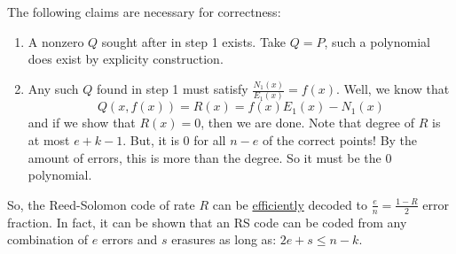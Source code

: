 The following claims are necessary for correctness:
\begin{enumerate}
    \item A nonzero $Q$ sought after in step 1 exists. Take $Q = P$, such a polynomial does exist by explicity construction.
    \item Any such $Q$ found in step 1 must satisfy $\frac{N_1(x)}{E_1(x)} = f(x)$. Well, we know that
    \[ Q(x, f(x)) = R(x) = f(x) E_1(x) - N_1(x) \]
    and if we show that $R(x) = 0$, then we are done. Note that degree of $R$ is at most $e + k - 1$. But, it is $0$ for all $n - e$ of the correct
    points! By the amount of errors, this is more than the degree. So it must be the 0 polynomial.
\end{enumerate}

So, the Reed-Solomon code of rate $R$ can be \underline{efficiently} decoded to $\frac{e}{n} = \frac{1 - R}{2}$ error fraction. In fact, it can be shown that an RS code can be coded from any
combination of $e$ errors and $s$ erasures as long as: $2e + s \leq n - k$.